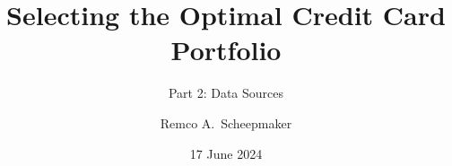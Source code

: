 \documentclass[notes,compress,sanserif,professionalfont]{beamer}
\begin{document}
\title{Selecting the Optimal Credit Card Portfolio}
\subtitle{Part 2: Data Sources}
\author{Remco A.~Scheepmaker}
\date{17 June 2024}

\begin{frame}
  \titlepage
\end{frame}



%
\end{document}
